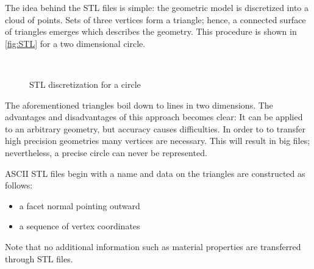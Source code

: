 The idea behind the STL files is simple: the geometric model is discretized into a cloud of points. Sets of three vertices form a triangle; hence, a connected surface of triangles emerges which describes the geometry. This procedure is shown in \autoref{fig:STL} for a two dimensional circle.  
\begin{figure}
\centering
   \\
   \caption{STL discretization for a circle}
   \label{fig:STL}
\end{figure}
The aforementioned triangles boil down to lines in two dimensions. The advantages and disadvantages of this approach becomes clear: It can be applied to an arbitrary geometry, but accuracy causes difficulties. In order to to transfer high precision geometries many vertices are necessary. This will result in big files; nevertheless, a precise circle can never be represented. 

ASCII STL files begin with a name and data on the triangles are constructed as follows: 
\begin{itemize}
\item a facet normal pointing outward
\item a sequence of vertex coordinates
\end{itemize}
Note that no additional information such as material properties are transferred through STL files. 
